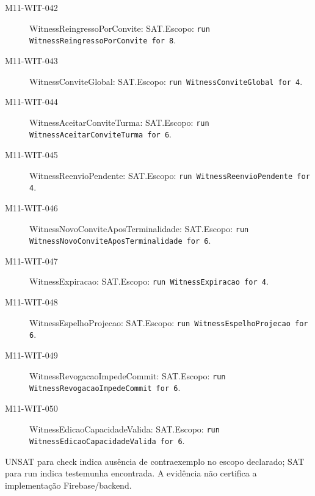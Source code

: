 \begin{description}
\item[M11-WIT-042] WitnessReingressoPorConvite: SAT.\newline Escopo: \texttt{run WitnessReingressoPorConvite for 8}.
\item[M11-WIT-043] WitnessConviteGlobal: SAT.\newline Escopo: \texttt{run WitnessConviteGlobal for 4}.
\item[M11-WIT-044] WitnessAceitarConviteTurma: SAT.\newline Escopo: \texttt{run WitnessAceitarConviteTurma for 6}.
\item[M11-WIT-045] WitnessReenvioPendente: SAT.\newline Escopo: \texttt{run WitnessReenvioPendente for 4}.
\item[M11-WIT-046] WitnessNovoConviteAposTerminalidade: SAT.\newline Escopo: \texttt{run WitnessNovoConviteAposTerminalidade for 6}.
\item[M11-WIT-047] WitnessExpiracao: SAT.\newline Escopo: \texttt{run WitnessExpiracao for 4}.
\item[M11-WIT-048] WitnessEspelhoProjecao: SAT.\newline Escopo: \texttt{run WitnessEspelhoProjecao for 6}.
\item[M11-WIT-049] WitnessRevogacaoImpedeCommit: SAT.\newline Escopo: \texttt{run WitnessRevogacaoImpedeCommit for 6}.
\item[M11-WIT-050] WitnessEdicaoCapacidadeValida: SAT.\newline Escopo: \texttt{run WitnessEdicaoCapacidadeValida for 6}.
\end{description}
UNSAT para check indica ausência de contraexemplo no escopo declarado; SAT para run indica testemunha encontrada. A evidência não certifica a implementação Firebase/backend.
